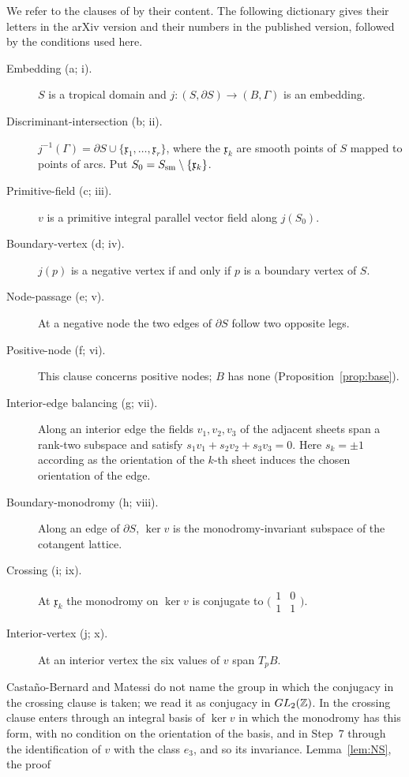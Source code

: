 We refer to the clauses of \cite[Def.~7.2]{CBM} by their content. The following dictionary gives their letters in
the arXiv version and their numbers in the published version, followed by the conditions used here.
\begin{description}
\item[Embedding (a; i).] $S$ is a tropical domain \cite[Def.~7.1]{CBM} and
$j\colon(S,\partial S)\to(B,\Gamma)$ is an embedding.
\item[Discriminant-intersection (b; ii).] $j^{-1}(\Gamma)=\partial S\cup\{\mathfrak x_1,\dots,\mathfrak x_r\}$,
where the $\mathfrak x_k$ are smooth points of $S$ mapped to points of arcs. Put
$S_0=S_{\rm sm}\setminus\{\mathfrak x_k\}$.
\item[Primitive-field (c; iii).] $v$ is a primitive integral parallel vector field along $j(S_0)$.
\item[Boundary-vertex (d; iv).] $j(p)$ is a negative vertex if and only if $p$ is a boundary vertex of $S$.
\item[Node-passage (e; v).] At a negative node the two edges of $\partial S$ follow two opposite legs.
\item[Positive-node (f; vi).] This clause concerns positive nodes; $B$ has none (Proposition~\ref{prop:base}).
\item[Interior-edge balancing (g; vii).] Along an interior edge the fields $v_1,v_2,v_3$ of the adjacent sheets span
a rank-two subspace and satisfy $s_1v_1+s_2v_2+s_3v_3=0$. Here $s_k=\pm1$ according as the orientation of the
$k$-th sheet induces the chosen orientation of the edge.
\item[Boundary-monodromy (h; viii).] Along an edge of $\partial S$, $\ker v$ is the monodromy-invariant subspace
of the cotangent lattice.
\item[Crossing (i; ix).] At $\mathfrak x_k$ the monodromy on $\ker v$ is conjugate to
$\bigl(\begin{smallmatrix}1&0\\1&1\end{smallmatrix}\bigr)$.
\item[Interior-vertex (j; x).] At an interior vertex the six values of $v$ span $T_pB$.
\end{description}
Casta\~no-Bernard and Matessi do not name the group in which the conjugacy in the crossing clause is taken; we read it as conjugacy in
$GL_2(\mathbb Z)$. In \cite[\S7.7, Step~6]{CBM} the crossing clause enters through an integral basis of $\ker v$ in which the monodromy has
this form, with no condition on the orientation of the basis, and in Step~7 through the identification of $v$ with the class $e_3$, and so its invariance. Lemma~\ref{lem:NS}, the proof
